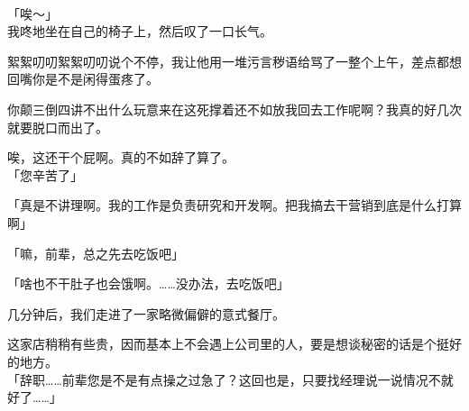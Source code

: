 \sqsplit\\

「唉～」\\

我咚地坐在自己的椅子上，然后叹了一口长气。

絮絮叨叨絮絮叨叨说个不停，我让他用一堆污言秽语给骂了一整个上午，差点都想回嘴你是不是闲得蛋疼了。

你颠三倒四讲不出什么玩意来在这死撑着还不如放我回去工作呢啊？我真的好几次就要脱口而出了。

唉，这还干个屁啊。真的不如辞了算了。\\

「您辛苦了」

「真是不讲理啊。我的工作是负责研究和开发啊。把我搞去干营销到底是什么打算啊」

「嘛，前辈，总之先去吃饭吧」

「啥也不干肚子也会饿啊。……没办法，去吃饭吧」\\

% 
\vspace{2\baselineskip}

几分钟后，我们走进了一家略微偏僻的意式餐厅。

这家店稍稍有些贵，因而基本上不会遇上公司里的人，要是想谈秘密的话是个挺好的地方。\\

「辞职……前辈您是不是有点操之过急了？这回也是，只要找经理说一说情况不就好了……」\\

